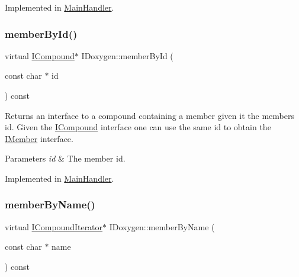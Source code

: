 Implemented in \mbox{\hyperlink{class_main_handler_a4455c328872b73a442a8e39fd81fba49}{Main\+Handler}}.

\mbox{\label{class_i_doxygen_ac7544d8d1dd53c3a8d1e180d81bca0e9}} 
\subsubsection{\texorpdfstring{memberById()}{memberById()}\hspace{0.1cm}{\footnotesize\ttfamily [2/2]}}
{\footnotesize\ttfamily virtual \mbox{\hyperlink{class_i_compound}{I\+Compound}}$\ast$ I\+Doxygen\+::member\+By\+Id (\begin{DoxyParamCaption}\item[{const char $\ast$}]{id }\end{DoxyParamCaption}) const\hspace{0.3cm}{\ttfamily [pure virtual]}}

Returns an interface to a compound containing a member given it the member\textquotesingle{}s id. Given the \mbox{\hyperlink{class_i_compound}{I\+Compound}} interface one can use the same id to obtain the \mbox{\hyperlink{class_i_member}{I\+Member}} interface. 
\begin{DoxyParams}{Parameters}
{\em id} & The member id. \\
\hline
\end{DoxyParams}


Implemented in \mbox{\hyperlink{class_main_handler_a4455c328872b73a442a8e39fd81fba49}{Main\+Handler}}.

\mbox{\label{class_i_doxygen_a1895a0347469d6e4788da0beca0e071c}} 
\subsubsection{\texorpdfstring{memberByName()}{memberByName()}\hspace{0.1cm}{\footnotesize\ttfamily [1/2]}}
{\footnotesize\ttfamily virtual \mbox{\hyperlink{class_i_compound_iterator}{I\+Compound\+Iterator}}$\ast$ I\+Doxygen\+::member\+By\+Name (\begin{DoxyParamCaption}\item[{const char $\ast$}]{name }\end{DoxyParamCaption}) const\hspace{0.3cm}{\ttfamily [pure virtual]}}

